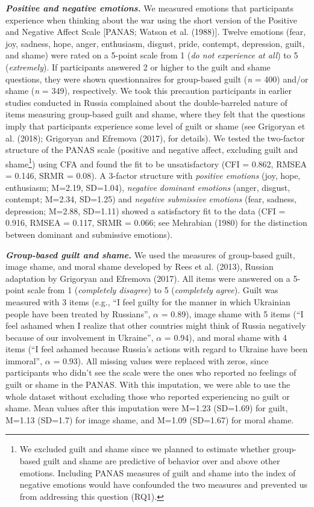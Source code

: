 \documentclass[
]{article}
\begin{document}
\textbf{\emph{Positive and negative emotions.}} We measured emotions that participants experience when thinking about the war using the short version of the Positive and Negative Affect Scale {[}PANAS; Watson et al. (1988){]}. Twelve emotions (fear, joy, sadness, hope, anger, enthusiasm, disgust, pride, contempt, depression, guilt, and shame) were rated on a 5-point scale from 1 (\emph{do not experience at all}) to 5 (\emph{extremely}). If participants answered 2 or higher to the guilt and shame questions, they were shown questionnaires for group-based guilt (\emph{n} = 400) and/or shame (\emph{n} = 349), respectively. We took this precaution participants in earlier studies conducted in Russia complained about the double-barreled nature of items measuring group-based guilt and shame, where they felt that the questions imply that participants experience some level of guilt or shame (see Grigoryan et al. (2018); Grigoryan and Efremova (2017), for details). We tested the two-factor structure of the PANAS scale (positive and negative affect, excluding guilt and shame\footnote{We excluded guilt and shame since we planned to estimate whether group-based guilt and shame are predictive of behavior over and above other emotions. Including PANAS measures of guilt and shame into the index of negative emotions would have confounded the two measures and prevented us from addressing this question (RQ1).}) using CFA and found the fit to be unsatisfactory (CFI = 0.862, RMSEA = 0.146, SRMR = 0.08). A 3-factor structure with \emph{positive emotions} (joy, hope, enthusiasm; M=2.19, SD=1.04), \emph{negative dominant emotions} (anger, disgust, contempt; M=2.34, SD=1.25) and \emph{negative submissive emotions} (fear, sadness, depression; M=2.88, SD=1.11) showed a satisfactory fit to the data (CFI = 0.916, RMSEA = 0.117, SRMR = 0.066; see Mehrabian (1980) for the distinction between dominant and submissive emotions).

\textbf{\emph{Group-based guilt and shame.}} We used the measures of group-based guilt, image shame, and moral shame developed by Rees et al. (2013), Russian adaptation by Grigoryan and Efremova (2017). All items were answered on a 5-point scale from 1 (\emph{completely disagree}) to 5 (\emph{completely agree}). Guilt was measured with 3 items (e.g., ``I feel guilty for the manner in which Ukrainian people have been treated by Russians'', \(\alpha\) = 0.89), image shame with 5 items (``I feel ashamed when I realize that other countries might think of Russia negatively because of our involvement in Ukraine'', \(\alpha\) = 0.94), and moral shame with 4 items (``I feel ashamed because Russia's actions with regard to Ukraine have been immoral'', \(\alpha\) = 0.93). All missing values were replaced with zeros, since participants who didn't see the scale were the ones who reported no feelings of guilt or shame in the PANAS. With this imputation, we were able to use the whole dataset without excluding those who reported experiencing no guilt or shame. Mean values after this imputation were M=1.23 (SD=1.69) for guilt, M=1.13 (SD=1.7) for image shame, and M=1.09 (SD=1.67) for moral shame.
\end{document}
